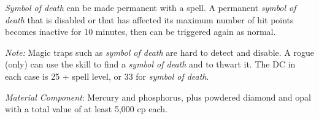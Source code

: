 {	\emph{Symbol of death} can be made permanent with a  spell. A permanent \emph{symbol of death} that is disabled or that has affected its maximum number of hit points becomes inactive for 10 minutes, then can be triggered again as normal.

	\textit{Note:}
	Magic traps such as \emph{symbol of death} are hard to detect and disable. A rogue (only) can use the  skill to find a \emph{symbol of death} and  to thwart it. The DC in each case is 25 + spell level, or 33 for \emph{symbol of death}.

	\textit{Material Component}:
	Mercury and phosphorus, plus powdered diamond and opal with a total value of at least 5,000 cp each.

}
